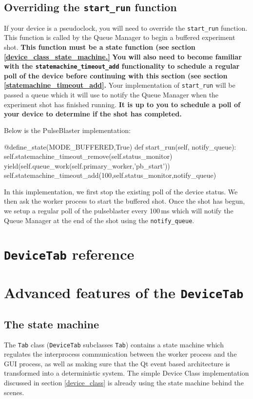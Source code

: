\documentclass[12pt]{article}
\begin{document}
\subsection{Overriding the \texttt{start\_run} function}
If your device is a pseudoclock, you will need to override the \texttt{start\_run} function.
This function is called by the Queue Manager to begin a buffered experiment shot.
\textbf{This function must be a state function (see section \ref{device_class_state_machine.}}
\textbf{You will also need to become familiar with the \texttt{statemachine\_timeout\_add} functionality to schedule a regular poll of the device before continuing with this section (see section \ref{statemachine_timeout_add}.}
Your implementation of \texttt{start\_run} will be passed a queue which it will use to notify the Queue Manager when the experiment shot has finished running.
\textbf{It is up to you to schedule a poll of your device to determine if the shot has completed.}

Below is the PulseBlaster implementation:
\begin{python}
@define_state(MODE_BUFFERED,True)  
def start_run(self, notify_queue):
    self.statemachine_timeout_remove(self.status_monitor)
    yield(self.queue_work(self.primary_worker,'pb_start'))
    self.statemachine_timeout_add(100,self.status_monitor,notify_queue)
\end{python}

In this implementation, we first stop the existing poll of the device status.
We then ask the worker process to start the buffered shot.
Once the shot has begun, we setup a regular poll of the pulseblaster every 100\,ms which will notify the Queue Manager at the end of the shot using the \texttt{notify\_queue}.


\section{\texttt{DeviceTab} reference}\label{device_class_reference}





\newpage
\section{Advanced features of the \texttt{DeviceTab}}
\subsection{The state machine}\label{device_class_state_machine}
The \texttt{Tab} class (\texttt{DeviceTab} subclasses \texttt{Tab}) contains a state machine which regulates the interprocess communication between the worker process and the GUI process, as well as making sure that the Qt event based architecture is transformed into a deterministic system. 
The simple Device Class implementation discussed in section \ref{device_class} is already using the state machine behind the scenes.
\end{document}
